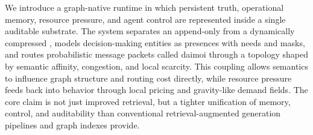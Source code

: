 We introduce a graph-native runtime in which persistent truth, operational memory, resource pressure, and agent control are represented inside a single auditable substrate. The system separates an append-only \truthgraph{} from a dynamically compressed \viewgraph{}, models decision-making entities as presences with needs and masks, and routes probabilistic message packets called daimoi through a topology shaped by semantic affinity, congestion, and local scarcity. This coupling allows semantics to influence graph structure and routing cost directly, while resource pressure feeds back into behavior through local pricing and gravity-like demand fields. The core claim is not just improved retrieval, but a tighter unification of memory, control, and auditability than conventional retrieval-augmented generation pipelines and graph indexes provide.

